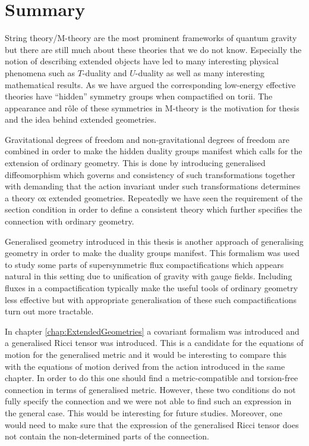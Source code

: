 \chapter{Summary}
String theory/M-theory are the most prominent frameworks of quantum gravity but there are still much about these theories that we do not know. Especially the notion of describing extended objects have led to many interesting physical phenomena such as $T$-duality and $U$-duality as well as many interesting mathematical results. As we have argued the corresponding low-energy effective theories have ``hidden'' symmetry groups when compactified on torii. The appearance and rôle of these symmetries in M-theory is the motivation for thesis and the idea behind extended geometries. 

Gravitational degrees of freedom and non-gravitational degrees of freedom are combined in order to make the hidden duality groups manifest which calls for the extension of ordinary geometry. This is done by introducing generalised diffeomorphism which governs and consistency of such transformations together with demanding that the action invariant under such transformations determines a theory ox extended geometries. Repeatedly we have seen the requirement of the section condition in order to define a consistent theory which further specifies the connection with ordinary geometry. 

Generalised geometry introduced in this thesis is another approach of generalising geometry in order to make the duality groups manifest. This formalism was used to study some parts of supersymmetric flux compactifications which appears natural in this setting due to unification of gravity with gauge fields. Including fluxes in a compactification typically make the useful tools of ordinary geometry less effective but with appropriate generalisation of these such compactifications turn out more tractable. 

In chapter \ref{chap:ExtendedGeometries} a covariant formalism was introduced and a generalised Ricci tensor was introduced. This is a candidate for the equations of motion for the generalised metric and it would be interesting to compare this with the equations of motion derived from the action introduced in the same chapter. In order to do this one should find a metric-compatible and torsion-free connection in terms of generalised metric. However, these two conditions do not fully specify the connection and we were not able to find such an expression in the general case. This would be interesting for future studies. Moreover, one would need to make sure that the expression of the generalised Ricci tensor does not contain the non-determined parts of the connection. 

